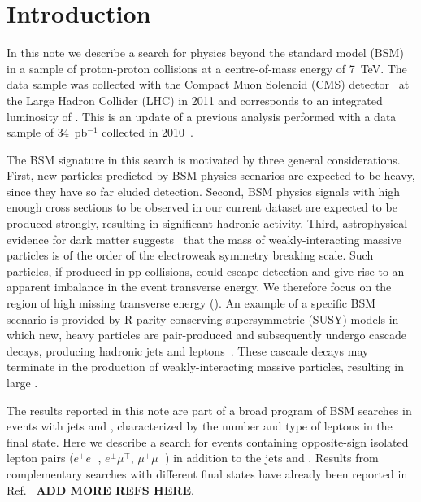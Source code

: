 \section{Introduction}
\label{sec:intro}

In this note we describe a search for physics beyond the standard model (BSM) 
in a sample of proton-proton collisions at a centre-of-mass energy of 7~TeV. 
The data sample was collected with the Compact Muon Solenoid (CMS) detector~\cite{JINST} at 
the Large Hadron Collider (LHC) in 2011
and corresponds to an integrated luminosity of \lumifinal.
This is an update of a previous analysis performed with a data sample of 34~pb$^{-1}$
collected in 2010~\cite{ref:ospaper}.

The BSM signature in this search is motivated  by three general  considerations. 
First, new particles predicted by BSM
physics scenarios are expected to be heavy, since they have so far eluded detection.
Second, BSM physics  signals with  high
enough  cross sections to  be observed  in our  current dataset are expected to be
produced  strongly,  resulting  in  significant hadronic  activity. 
Third, astrophysical evidence for
dark matter  suggests~\cite{ref:DM,ref:DM2}  that the mass  of weakly-interacting
massive particles is of the  order of the electroweak symmetry breaking
scale. Such particles, if produced in pp collisions, could escape detection and give rise to
an apparent imbalance in the  event transverse energy. We therefore focus  on the
region  of  high missing transverse energy (\MET). An  example of  a  specific  BSM scenario  is
provided by R-parity conserving  supersymmetric (SUSY) models in which
new,  heavy  particles  are  pair-produced  and  subsequently  undergo
cascade       decays,      producing      hadronic       jets      and
leptons~\cite{Martin:fk,susy1,susy2,susy3,susy4,susy5,susy6}.  
These cascade decays  may terminate  in the
production  of weakly-interacting massive  particles,  resulting in large \MET.

The results reported in this note are part of a broad program of BSM searches
in events with jets and \MET, characterized by the number and
type of leptons in the final state.  
Here we describe a search for events containing opposite-sign isolated
lepton pairs ($e^+e^-$, $e^{\pm}\mu^{\mp}$, $\mu^+\mu^-$) in addition to the jets
and \MET. Results from complementary searches with different final states have 
already been reported in Ref.~\cite{ref:RA1} {\bf ADD MORE REFS HERE}.

